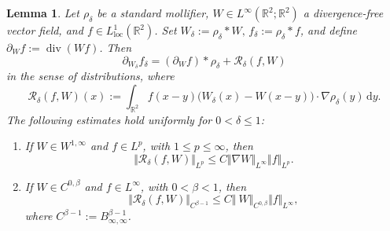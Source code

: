 \documentclass[reqno,11pt,a4paper]{amsart}
\newtheorem{lemma}[theorem]{Lemma}
\newcommand{\dd}{\mathrm{d}}
\begin{document}
\begin{lemma}\label{lem:mollified-striated}
Let $\rho_\delta$ be a standard mollifier,
$W\in L^\infty(\mathbb R^2;\mathbb R^2)$
a divergence-free vector field, and
$f\in L^1_{\mathrm{loc}}(\mathbb R^2)$.
Set $W_\delta:=\rho_\delta*W,\,f_\delta:=\rho_\delta*f$, 
and define $\partial_Wf:=\operatorname{div}(Wf)$.
Then
\[
  \partial_{W_\delta}f_\delta
  =
  (\partial_Wf)*\rho_\delta+\mathcal R_\delta(f,W)
\]
in the sense of distributions, where
\[
  \mathcal R_\delta(f,W)(x)
  :=
  \int_{\mathbb R^2}
  f(x-y)\bigl(W_\delta(x)-W(x-y)\bigr)
  \cdot\nabla\rho_\delta(y)\,\dd y.
\]
The following estimates hold uniformly for
$0<\delta\leq1$:
\begin{enumerate}
\item
If $W\in W^{1,\infty}$ and $f\in L^p$,
with $1\leq p\leq\infty$, then
\begin{equation}\label{eq:Rdelta-comm1}
  \Vert \mathcal R_\delta(f,W)\Vert _{L^p}
  \leq C\Vert \nabla W\Vert _{L^\infty}\Vert f\Vert _{L^p}.
\end{equation}

\item
If $W\in C^{0,\beta}$ and $f\in L^\infty$,
with $0<\beta<1$, then
\begin{equation}\label{eq:Rdelta-comm8}
  \Vert \mathcal R_\delta(f,W)\Vert _{C^{\beta-1}}
  \leq C\Vert \ W\Vert _{C^{0,\beta}}\Vert f\Vert _{L^\infty},
\end{equation}
where $C^{\beta-1}:=B^{\beta-1}_{\infty,\infty}$.
\end{enumerate}
\end{lemma}
\end{document}
